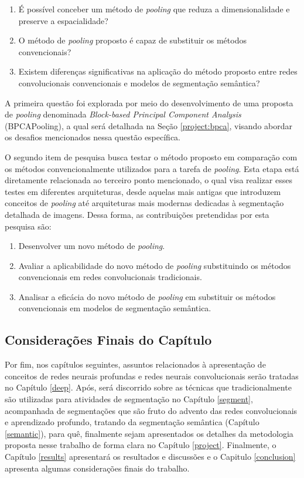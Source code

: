 \begin{enumerate}
    \item É possível conceber um método de \textit{pooling} que reduza a dimensionalidade e preserve a espacialidade?
    \item O método de \textit{pooling} proposto é capaz de substituir os métodos convencionais?
    \item Existem diferenças significativas na aplicação do método proposto entre redes convolucionais convencionais e modelos de segmentação semântica?
\end{enumerate}

A primeira questão foi explorada por meio do desenvolvimento de uma proposta de \textit{pooling} denominada \textit{Block-based Principal Component Analysis} (BPCAPooling), a qual será detalhada na Seção \ref{project:bpca}, visando abordar os desafios mencionados nessa questão específica.

O segundo item de pesquisa busca testar o método proposto em comparação com os métodos convencionalmente utilizados para a tarefa de \textit{pooling}. Esta etapa está diretamente relacionada ao terceiro ponto mencionado, o qual visa realizar esses testes em diferentes arquiteturas, desde aquelas mais antigas que introduzem conceitos de \textit{pooling} até arquiteturas mais modernas dedicadas à segmentação detalhada de imagens. Dessa forma, as contribuições pretendidas por esta pesquisa são:

\begin{enumerate}
    \item Desenvolver um novo método de \textit{pooling}.
    \item Avaliar a aplicabilidade do novo método de \textit{pooling} substituindo os métodos convencionais em redes convolucionais tradicionais.
    \item Analisar a eficácia do novo método de \textit{pooling} em substituir os métodos convencionais em modelos de segmentação semântica.
\end{enumerate}


\subsection{Considerações Finais do Capítulo}
\label{intro:end}
Por fim, nos capítulos seguintes, assuntos relacionados à apresentação de conceitos de redes neurais profundas e redes neurais convolucionais serão tratadas no Capítulo \ref{deep}. Após, será discorrido sobre as técnicas que tradicionalmente são utilizadas para atividades de segmentação no Capítulo \ref{segment}, acompanhada de segmentações que são fruto do advento das redes convolucionais e aprendizado profundo, tratando da segmentação semântica (Capítulo \ref{semantic}), para quê, finalmente sejam apresentados os detalhes da metodologia proposta nesse trabalho de forma clara no Capítulo \ref{project}.  Finalmente, o Capítulo \ref{results} apresentará os resultados e discussões e o Capitulo \ref{conclusion} apresenta algumas considerações finais do trabalho.